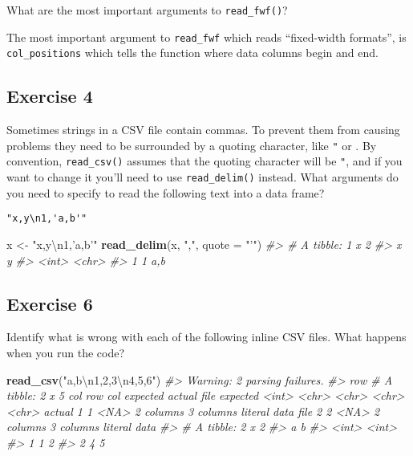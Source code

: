 \documentclass[]{book}
\newenvironment{Shaded}{\begin{snugshade}}{\end{snugshade}}
\newcommand{\CharTok}[1]{\textcolor[rgb]{0.31,0.60,0.02}{#1}}
\newcommand{\CommentTok}[1]{\textcolor[rgb]{0.56,0.35,0.01}{\textit{#1}}}
\newcommand{\DataTypeTok}[1]{\textcolor[rgb]{0.13,0.29,0.53}{#1}}
\newcommand{\KeywordTok}[1]{\textcolor[rgb]{0.13,0.29,0.53}{\textbf{#1}}}
\newcommand{\NormalTok}[1]{#1}
\newcommand{\StringTok}[1]{\textcolor[rgb]{0.31,0.60,0.02}{#1}}
\theoremstyle{definition}
\theoremstyle{definition}
\theoremstyle{definition}
\theoremstyle{remark}
\begin{document}
What are the most important arguments to \texttt{read\_fwf()}?

The most important argument to \texttt{read\_fwf} which reads
``fixed-width formats'', is \texttt{col\_positions} which tells the
function where data columns begin and end.

\hypertarget{exercise-4-10}{%
\subsection{Exercise 4}\label{exercise-4-10}}

Sometimes strings in a CSV file contain commas. To prevent them from
causing problems they need to be surrounded by a quoting character, like
\texttt{"} or \texttt{\textquotesingle{}}. By convention,
\texttt{read\_csv()} assumes that the quoting character will be
\texttt{"}, and if you want to change it you'll need to use
\texttt{read\_delim()} instead. What arguments do you need to specify to
read the following text into a data frame?

\begin{verbatim}
"x,y\n1,'a,b'"
\end{verbatim}

\begin{Shaded}
\begin{Highlighting}[]
\NormalTok{x <-}\StringTok{ "x,y}\CharTok{\textbackslash{}n}\StringTok{1,'a,b'"}
\KeywordTok{read_delim}\NormalTok{(x, }\StringTok{","}\NormalTok{, }\DataTypeTok{quote =} \StringTok{"'"}\NormalTok{)}
\CommentTok{#> # A tibble: 1 x 2}
\CommentTok{#>       x y    }
\CommentTok{#>   <int> <chr>}
\CommentTok{#> 1     1 a,b}
\end{Highlighting}
\end{Shaded}

\hypertarget{exercise-6-5}{%
\subsection{Exercise 6}\label{exercise-6-5}}

Identify what is wrong with each of the following inline CSV files. What
happens when you run the code?

\begin{Shaded}
\begin{Highlighting}[]
\KeywordTok{read_csv}\NormalTok{(}\StringTok{"a,b}\CharTok{\textbackslash{}n}\StringTok{1,2,3}\CharTok{\textbackslash{}n}\StringTok{4,5,6"}\NormalTok{)}
\CommentTok{#> Warning: 2 parsing failures.}
\CommentTok{#> row # A tibble: 2 x 5 col     row col   expected  actual    file         expected   <int> <chr> <chr>     <chr>     <chr>        actual 1     1 <NA>  2 columns 3 columns literal data file 2     2 <NA>  2 columns 3 columns literal data}
\CommentTok{#> # A tibble: 2 x 2}
\CommentTok{#>       a     b}
\CommentTok{#>   <int> <int>}
\CommentTok{#> 1     1     2}
\CommentTok{#> 2     4     5}
\end{Highlighting}
\end{Shaded}
\end{document}
